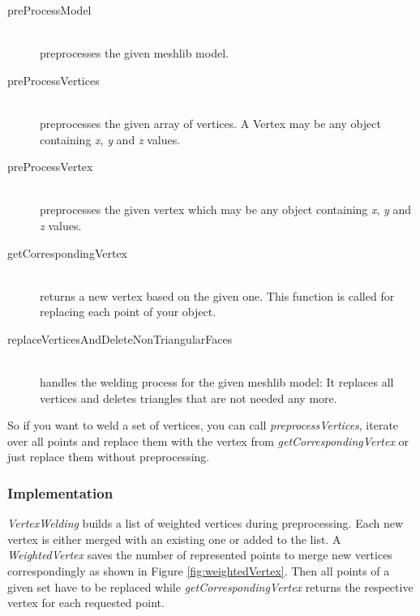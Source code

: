 \documentclass[../ClassicThesis.tex]{subfiles}
\begin{document}

\begin{description}

\item[preProcessModel] \hfill \\
preprocesses the given meshlib model.

\item[preProcessVertices] \hfill \\
preprocesses the given array of vertices. A Vertex may be any object containing \emph{x}, \emph{y} and \emph{z} values.

\item[preProcessVertex] \hfill \\
preprocesses the given vertex which may be any object containing \emph{x}, \emph{y} and \emph{z} values.

\item[getCorrespondingVertex] \hfill \\
returns a new vertex based on the given one. This function is called for replacing each point of your object.

\item[replaceVerticesAndDeleteNonTriangularFaces] \hfill \\
handles the welding process for the given meshlib model: It replaces all vertices and deletes triangles that are not needed any more.

\end{description}

So if you want to weld a set of vertices, you can call \emph{preprocessVertices}, iterate over all points and replace them with the vertex from \emph{getCorrespondingVertex} or just replace them without preprocessing.

\subsubsection{Implementation}


\emph{VertexWelding} builds a list of weighted vertices during preprocessing. Each new vertex is either merged with an existing one or added to the list. A \emph{WeightedVertex} saves the number of represented points to merge new vertices correspondingly as shown in Figure \ref{fig:weightedVertex}. Then all points of a given set have to be replaced while \emph{getCorrespondingVertex} returns the respective vertex for each requested point. 
\end{document}
